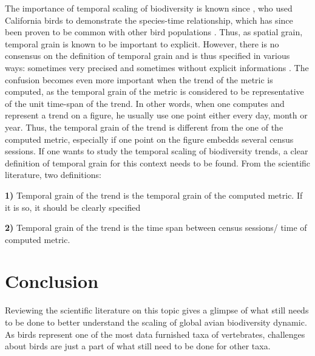\documentclass[
  12pt,
  oneside]{report}
\begin{document}
The importance of temporal scaling of biodiversity is known since \textcite{grinnell_role_1922}, who used California birds to demonstrate the species-time relationship, which has since been proven to be common with other bird populations \autocite{white_two-phase_2004}. Thus, as spatial grain, temporal grain is known to be important to explicit. However, there is no consensus on the definition of temporal grain and is thus specified in various ways: sometimes very precised \autocite[\emph{e.g.} time of each census point, as in][]{schipper_contrasting_2016} and sometimes without explicit informations \autocite[\emph{e.g.}][\emph{`The sites are visited twice a year (April to early May and late May to June), during which volunteers walk two parallel 1-km-long transect lines {[}\ldots{]}'}]{harrison_assessing_2014}. The confusion becomes even more important when the trend of the metric is computed, as the temporal grain of the metric is considered to be representative of the unit time-span of the trend. In other words, when one computes and represent a trend on a figure, he usually use one point either every day, month or year. Thus, the temporal grain of the trend is different from the one of the computed metric, especially if one point on the figure embedds several census sessions. If one wants to study the temporal scaling of biodiversity trends, a clear definition of temporal grain for this context needs to be found. From the scientific literature, two definitions:

\textbf{1)} Temporal grain of the trend is the temporal grain of the computed metric. If it is so, it should be clearly specified

\textbf{2)} Temporal grain of the trend is the time span between census sessions/ time of computed metric.

\hypertarget{conclusion}{%
\chapter{Conclusion}\label{conclusion}}

Reviewing the scientific literature on this topic gives a glimpse of what still needs to be done to better understand the scaling of global avian biodiversity dynamic. As birds represent one of the most data furnished taxa of vertebrates, challenges about birds are just a part of what still need to be done for other taxa.

\newpage
\begin{singlespacing}
\printbibliography[heading=bibintoc, title={References}]
\end{singlespacing}
\end{document}

